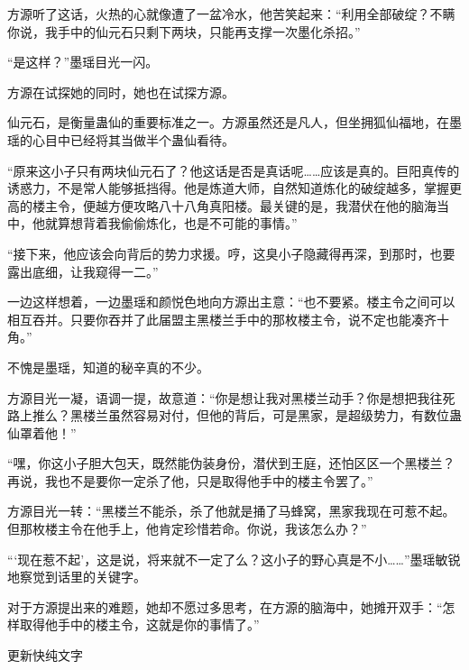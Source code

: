\begin{this_body}
方源听了这话，火热的心就像遭了一盆冷水，他苦笑起来：“利用全部破绽？不瞒你说，我手中的仙元石只剩下两块，只能再支撑一次墨化杀招。”

“是这样？”墨瑶目光一闪。

方源在试探她的同时，她也在试探方源。

仙元石，是衡量蛊仙的重要标准之一。方源虽然还是凡人，但坐拥狐仙福地，在墨瑶的心目中已经将其当做半个蛊仙看待。

“原来这小子只有两块仙元石了？他这话是否是真话呢……应该是真的。巨阳真传的诱惑力，不是常人能够抵挡得。他是炼道大师，自然知道炼化的破绽越多，掌握更高的楼主令，便越方便攻略八十八角真阳楼。最关键的是，我潜伏在他的脑海当中，他就算想背着我偷偷炼化，也是不可能的事情。”

“接下来，他应该会向背后的势力求援。哼，这臭小子隐藏得再深，到那时，也要露出底细，让我窥得一二。”

一边这样想着，一边墨瑶和颜悦色地向方源出主意：“也不要紧。楼主令之间可以相互吞并。只要你吞并了此届盟主黑楼兰手中的那枚楼主令，说不定也能凑齐十角。”

不愧是墨瑶，知道的秘辛真的不少。

方源目光一凝，语调一提，故意道：“你是想让我对黑楼兰动手？你是想把我往死路上推么？黑楼兰虽然容易对付，但他的背后，可是黑家，是超级势力，有数位蛊仙罩着他！”

“嘿，你这小子胆大包天，既然能伪装身份，潜伏到王庭，还怕区区一个黑楼兰？再说，我也不是要你一定杀了他，只是取得他手中的楼主令罢了。”

方源目光一转：“黑楼兰不能杀，杀了他就是捅了马蜂窝，黑家我现在可惹不起。但那枚楼主令在他手上，他肯定珍惜若命。你说，我该怎么办？”

“‘现在惹不起’，这是说，将来就不一定了么？这小子的野心真是不小……”墨瑶敏锐地察觉到话里的关键字。

对于方源提出来的难题，她却不愿过多思考，在方源的脑海中，她摊开双手：“怎样取得他手中的楼主令，这就是你的事情了。”

更新快纯文字

\end{this_body}

